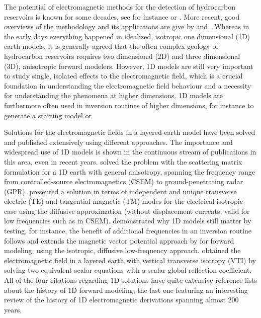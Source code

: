\documentclass[manuscript,revised]{geophysics}
\begin{document}
The potential of electromagnetic methods for the detection of hydrocarbon
reservoirs is known for some decades, see for instance \cite{PIEEE.89.Nekut} or
\cite{B.SEG.91.Chave}. More recent, good overviews of the methodology and its
applications are give by \cite{SG.05.Edwards} and \cite{IEEE.12.Ziolkowksi}.
Whereas in the early days everything happened in idealized, isotropic one
dimensional (1D) earth models, it is generally agreed that the often complex
geology of hydrocarbon reservoirs requires two dimensional (2D) and three
dimensional (3D), anisotropic forward modelers. However, 1D models are still
very important   to study
single, isolated effects to the electromagnetic field, which is a crucial
foundation in understanding the electromagnetic field behaviour and a necessity
for understanding the phenomena at higher dimensions. 1D models are furthermore
often used in inversion routines of higher dimensions, for instance to generate
a starting model or  

Solutions for the electromagnetic fields in a layered-earth model have been
solved and published extensively using different approaches. The importance and
wide\-spread use of 1D models is shown in the continuous stream of publications
in this area, even in recent years. \cite{GJI.07.Loseth} solved the problem
with the scattering matrix formulation for a 1D earth with general anisotropy,
spanning the frequency range from controlled-source electromagnetics (CSEM) to
ground-pe\-ne\-tra\-ting radar (GPR).  \cite{GJI.09.Chave} presented a solution
in terms of independent and unique transverse electric (TE) and tangential
magnetic (TM) modes for the electrical isotropic case using the diffusive
approximation (without displacement currents, valid for low frequencies such as
in CSEM). \cite{GEO.09.Key} demonstrated why 1D models still matter by testing,
for instance, the benefit of additional frequencies in an inversion
routine follows and extends the magnetic vector potential
approach by \cite{B.AP.82.Wait} for forward modeling, using the isotropic,
diffusive low-frequency approach.  \cite{GEO.15.Hunziker} obtained the
electromagnetic field in a layered earth with vertical transverse iso\-tro\-py
(VTI) by solving two equivalent scalar equations with a scalar global
reflection coefficient.  All of the four citations regarding 1D solutions have
quite extensive reference lists about the history of 1D forward modeling, the
last one featuring an interesting review of the history of 1D electromagnetic
derivations spanning almost 200 years.
\end{document}
